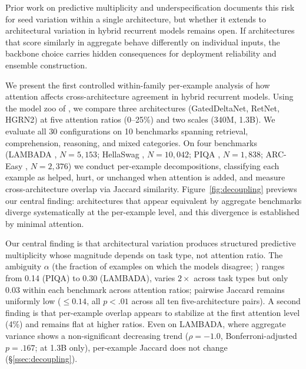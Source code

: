 Prior work on predictive multiplicity \citep{marx2020predictive} and underspecification \citep{damour2022underspecification,mccoy2020berts} documents this risk for seed variation within a single architecture, but whether it extends to architectural variation in hybrid recurrent models remains open. If architectures that score similarly in aggregate behave differently on individual inputs, the backbone choice carries hidden consequences for deployment reliability and ensemble construction.

We present the first controlled within-family per-example analysis of how attention affects cross-architecture agreement in hybrid recurrent models. Using the model zoo of \citet{wang2025hybrid}, we compare three architectures (GatedDeltaNet, RetNet, HGRN2) at five attention ratios (0--25\%) and two scales (340M, 1.3B). We evaluate all 30 configurations on 10 benchmarks spanning retrieval, comprehension, reasoning, and mixed categories. On four benchmarks (LAMBADA \citealp{paperno2016lambada}, $N = 5{,}153$; HellaSwag \citealp{zellers2019hellaswag}, $N = 10{,}042$; PIQA \citealp{bisk2020piqa}, $N = 1{,}838$; ARC-Easy \citealp{clark2018arc}, $N = 2{,}376$) we conduct per-example decompositions, classifying each example as helped, hurt, or unchanged when attention is added, and measure cross-architecture overlap via Jaccard similarity. Figure~\ref{fig:decoupling} previews our central finding: architectures that appear equivalent by aggregate benchmarks diverge systematically at the per-example level, and this divergence is established by minimal attention.

Our central finding is that architectural variation produces structured predictive multiplicity whose magnitude depends on task type, not attention ratio. The ambiguity $\alpha$ (the fraction of examples on which the models disagree; \citealp{marx2020predictive}) ranges from 0.14 (PIQA) to 0.30 (LAMBADA), varies $2\times$ across task types but only 0.03 within each benchmark across attention ratios; pairwise Jaccard remains uniformly low ($\leq 0.14$, all $p < .01$ across all ten five-architecture pairs). A second finding is that per-example overlap appears to stabilize at the first attention level (4\%) and remains flat at higher ratios. Even on LAMBADA, where aggregate variance shows a non-significant decreasing trend ($\rho = -1.0$, Bonferroni-adjusted $p = .167$; at 1.3B only), per-example Jaccard does not change (\S\ref{ssec:decoupling}).

